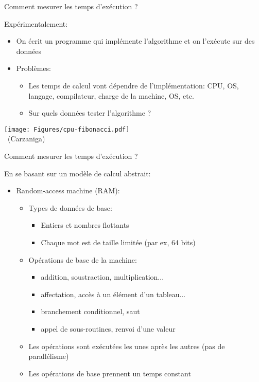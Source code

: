 \begin{frame}{Comment mesurer les temps d'exécution ?}

Expérimentalement:
\begin{itemize}
\item On écrit un programme qui implémente l'algorithme et on l'exécute sur des données
\item Problèmes:
\begin{itemize}
\item Les temps de calcul vont dépendre de l'implémentation: CPU, OS, langage, compilateur, charge de la machine, OS, etc.
\item Sur quels données tester l'algorithme ?
\end{itemize}
\end{itemize}

\begin{center}
\texttt{[image: Figures/cpu-fibonacci.pdf]}\\
~\hfill\scriptsize(Carzaniga)
\end{center}

\end{frame}

\begin{frame}{Comment mesurer les temps d'exécution ?}

En se basant sur un modèle de calcul abstrait:
\begin{itemize}
\item Random-access machine (RAM):
\begin{itemize}
\item Types de données de base:
\begin{itemize}
\item Entiers et nombres flottants
\item Chaque mot est de taille limitée (par ex, 64 bits)
\end{itemize}
\item Opérations de base de la machine:
\begin{itemize}
\item addition, soustraction, multiplication...
\item affectation, accès à un élément d'un tableau...
\item branchement conditionnel, saut
\item appel de sous-routines, renvoi d'une valeur
\end{itemize}
\item Les opérations sont exécutées les unes après les autres (pas de parallélisme)
\item \alert{Les opérations de base prennent un temps constant}
\end{itemize}
\end{itemize}
\end{frame}

